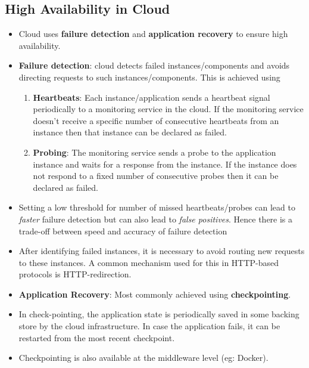 \documentclass{article}
\begin{document}
\subsection{High Availability in Cloud}
\begin{itemize}
    \item Cloud uses \textbf{failure detection} and \textbf{application recovery} to ensure high availability.
    
    \item \textbf{Failure detection}: cloud detects failed instances/components and avoids directing requests to such instances/components. This is achieved using
    \begin{enumerate}
        \item \textbf{Heartbeats}: Each instance/application sends a heartbeat signal periodically to a monitoring service in the cloud. If the monitoring service doesn't receive a specific number of consecutive heartbeats from an instance then that instance can be declared as failed.
        
        \item \textbf{Probing}: The monitoring service sends a probe to the application instance and waits for a response from the instance. If the instance does not respond to a fixed number of consecutive probes then it can be declared as failed. 
    \end{enumerate}
    
    \item Setting a low threshold for number of missed heartbeats/probes can lead to \textit{faster} failure detection but can also lead to \textit{false positives}. Hence there is a trade-off between speed and accuracy of failure detection
    
    \item After identifying failed instances, it is necessary to avoid routing new requests to these instances. A common mechanism used for this in HTTP-based protocols is HTTP-redirection.
    
    \item \textbf{Application Recovery}: Most commonly achieved using \textbf{checkpointing}.
    
    \item In check-pointing, the application state is periodically saved in some backing store by the cloud infrastructure. In case the application fails, it can be restarted from the most recent checkpoint. 
    
    \item Checkpointing is also available at the middleware level (eg: Docker). 
\end{itemize}
\end{document}
